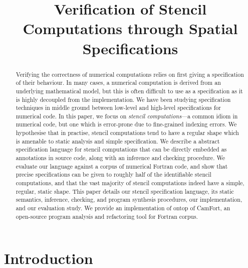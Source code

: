 \documentclass[9pt]{sigplanconf}
\title{Verification of Stencil Computations through Spatial
  Specifications}
\theoremstyle{definition}
\begin{document}
\maketitle

\begin{abstract}
  Verifying the correctness of numerical computations relies on first
  giving a specification of their behaviour. In many cases, a
  numerical computation is derived from an underlying mathematical
  model, but this is often difficult to use as a specification as it
  is highly decoupled from the implementation. We have been studying
  specification techniques in middle ground between low-level and
  high-level specifications for numerical code. In this paper, we
  focus on \emph{stencil computations}---a common idiom in numerical code, but
  one which is error-prone due to fine-grained indexing errors. We
  hypothesise that in practise, stencil computations tend to have a
  regular shape which is amenable to static analysis and simple
  specification. We describe a abstract specification language for
  stencil computations that can be directly embedded as annotations in
  source code, along with an inference and checking procedure. We
  evaluate our language against a corpus of numerical Fortran code,
  and show that precise specifications can be given to roughly half of
  the identifiable stencil computations, and that the vast majority of
  stencil computations indeed have a simple, regular, static
  shape. This paper details our stencil specification language, its
  static semantics, inference, checking, and program synthesis
  procedures, our implementation, and our evaluation study. We provide
  an implementation of ontop of CamFort, an
  open-source program analysis and refactoring tool for Fortran corpus.
\end{abstract}




\section{Introduction}
\end{document}
